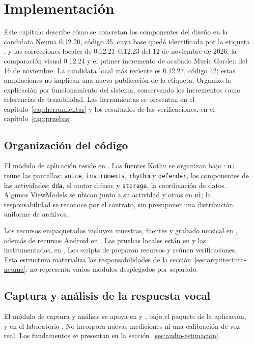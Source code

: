 \chapter{Implementación}
\label{cap:implementacion}
Este capítulo describe cómo se concretan los componentes del diseño en la
candidata Neuma 0.12.20, código 35, cuya base quedó identificada por la etiqueta
, y las correcciones locales de 0.12.21--0.12.23
del 12 de noviembre de 2026, la comparación visual 0.12.24 y el primer
incremento de acabado Music Garden del 16 de noviembre. La candidata local
más reciente es 0.12.27, código 42; estas ampliaciones no implican una nueva
publicación de la etiqueta.
Organizo la explicación por funcionamiento del
sistema, conservando los incrementos como referencias de trazabilidad. Las
herramientas se presentan en el capítulo~\ref{cap:herramientas} y los resultados
de las verificaciones, en el capítulo~\ref{cap:pruebas}.

\section{Organización del código}
El módulo de aplicación reside en . Las fuentes Kotlin
se organizan bajo : \texttt{ui} reúne las
pantallas; \texttt{voice}, \texttt{instruments}, \texttt{rhythm} y
\texttt{defender}, los componentes de las actividades; \texttt{dda}, el motor
difuso; y \texttt{storage}, la coordinación de datos. Algunos ViewModels se
ubican junto a su actividad y otros en \texttt{ui}; la responsabilidad se
reconoce por el contrato, sin presuponer una distribución uniforme de archivos.

Los recursos empaquetados incluyen muestras, fuentes y grabado musical en
, además de recursos Android en .
Las pruebas locales están en  y las instrumentadas, en
. Los scripts de  preparan recursos
y reúnen verificaciones. Esta estructura materializa las responsabilidades
de la sección~\ref{sec:arquitectura-neuma}; no representa varios módulos
desplegados por separado.

\section{Captura y análisis de la respuesta vocal}
\label{sec:implementacion-audio}
El módulo de captura y análisis se apoya en  y
, bajo el paquete de la aplicación, y en el laboratorio
. No incorpora nuevas mediciones ni una calibración de
voz real. Los fundamentos se presentan en la sección~\ref{sec:audio-estimacion}.

